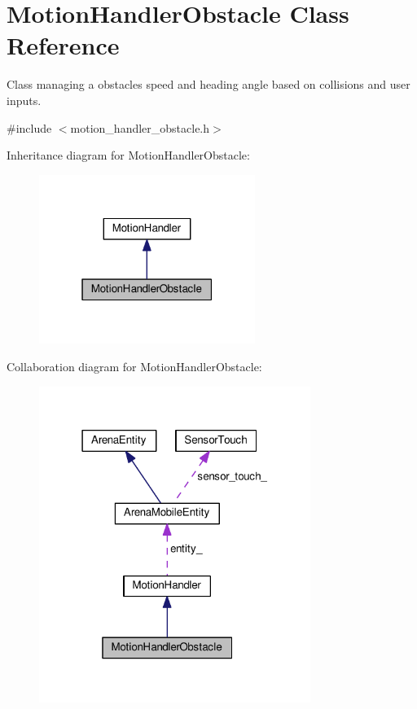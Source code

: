 \hypertarget{classMotionHandlerObstacle}{}\section{Motion\+Handler\+Obstacle Class Reference}
\label{classMotionHandlerObstacle}


Class managing a obstacle\textquotesingle{}s speed and heading angle based on collisions and user inputs.  




{\ttfamily \#include $<$motion\+\_\+handler\+\_\+obstacle.\+h$>$}



Inheritance diagram for Motion\+Handler\+Obstacle\+:\nopagebreak
\begin{figure}[H]
\begin{center}
\leavevmode
\includegraphics[width=199pt]{classMotionHandlerObstacle__inherit__graph}
\end{center}
\end{figure}


Collaboration diagram for Motion\+Handler\+Obstacle\+:\nopagebreak
\begin{figure}[H]
\begin{center}
\leavevmode
\includegraphics[width=250pt]{classMotionHandlerObstacle__coll__graph}
\end{center}
\end{figure}
